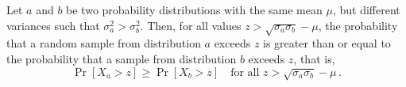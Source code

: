 %
\begin{lemma}
\label{lemma-same_mean_different_variance_bound}
Let \( a \) and \( b \) be two probability distributions with the same mean \( \mu \), but different variances such that \( \sigma_a^2 > \sigma_b^2 \). 
%
Then, for all values \( z > \sqrt{\sigma_a \sigma_b} - \mu \), the probability that a random sample from distribution \( a \) exceeds \( z \) is greater than or equal to the probability that a sample from distribution \( b \) exceeds \( z \), that is,
%
\begin{equation}
    \Pr[X_a > z] \geq \Pr[X_b > z] \quad \text{for all } z > \sqrt{\sigma_a \sigma_b} - \mu \,.
\end{equation}
%
\end{lemma}
%
